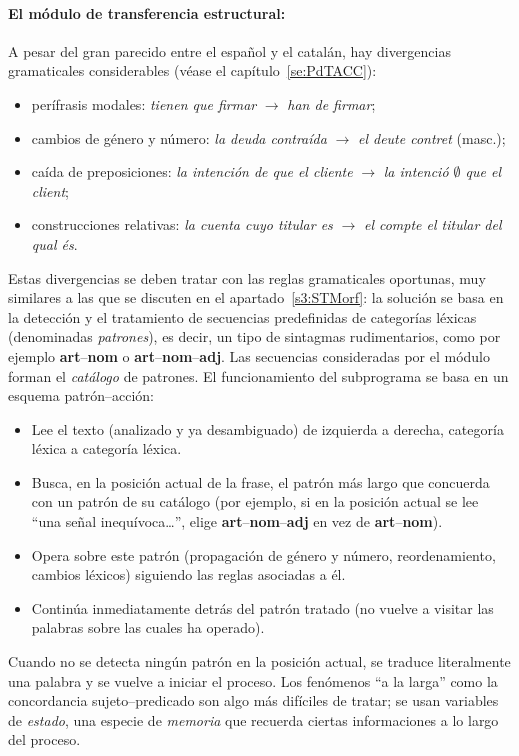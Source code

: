{\paragraph{El módulo de transferencia estructural:} A pesar del gran parecido entre el español y el catalán, hay divergencias gramaticales considerables (véase el capítulo~\ref{se:PdTACC}): \begin{itemize} \item perífrasis modales: \emph{tienen que firmar} $\rightarrow$ \emph{han de firmar}; \item cambios de género y número: \emph{la deuda contraída} $\rightarrow$ \emph{el deute contret} (masc.); \item caída de preposiciones: \emph{la intención de que el cliente} $\rightarrow$ \emph{la intenció $\emptyset$ que el client}; \item construcciones relativas: \emph{la cuenta cuyo titular es} $\rightarrow$ \emph{el compte el titular del qual és}. \end{itemize} Estas divergencias se deben tratar con las reglas gramaticales oportunas, muy similares a las que se discuten en el apartado~\ref{s3:STMorf}: la solución se basa en la detección y el tratamiento de secuencias predefinidas de categorías léxicas (denominadas \emph{patrones}), es decir, un tipo de sintagmas rudimentarios, como por ejemplo {\bf art}--{\bf nom} o {\bf art}--{\bf nom}--{\bf adj}. Las secuencias consideradas por el módulo  forman el \emph{catálogo} de patrones. El funcionamiento del subprograma se basa en un esquema patrón--acción: \begin{itemize} \item Lee el texto (analizado y ya desambiguado) de izquierda a derecha, categoría léxica a categoría léxica. \item Busca, en la posición actual de la frase, el patrón más largo que concuerda con un patrón de su catálogo (por ejemplo, si en la posición actual se lee ``una señal inequívoca\ldots'', elige {\bf art}--{\bf nom}--{\bf adj} en vez de {\bf art}--{\bf nom}). \item Opera sobre este patrón (propagación de género y número, reordenamiento, cambios léxicos) siguiendo las reglas asociadas a él. \item Continúa inmediatamente detrás del patrón tratado (no vuelve a visitar las palabras sobre las cuales ha operado). \end{itemize} Cuando no se detecta ningún patrón en la posición actual, se traduce literalmente una palabra y se vuelve a iniciar el proceso. Los fenómenos ``a la larga'' como la concordancia sujeto--predicado son algo más difíciles de tratar; se usan variables de \emph{estado}, una especie de \emph{memoria } que recuerda ciertas informaciones a lo largo del proceso. 

}
